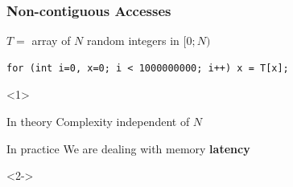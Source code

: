 \documentclass[xcolor={x11names,svgnames}]{beamer}
\begin{document}
\begin{frame}[fragile,label=pointer_jumping]
  \frametitle{Non-contiguous Accesses}

  $T =$ array of $N$ random integers in $[0; N)$

  \smallskip
  
\begin{verbatim}
for (int i=0, x=0; i < 1000000000; i++) x = T[x];
\end{verbatim}
\begin{overlayarea}{\textwidth}{6.5cm}
  \begin{onlyenv}<1>
    \bigskip
    \begin{exampleblock}{In theory}
      Complexity independent of $N$
    \end{exampleblock}

    \medskip

    \begin{alertblock}{In practice}
      We are dealing with memory \textbf{latency}
    \end{alertblock}

\end{onlyenv}
  \begin{onlyenv}<2->
    \begin{center}
      \vspace{-0.33cm}
    \end{center}
\end{onlyenv}
\end{overlayarea}
\end{frame}
\end{document}
